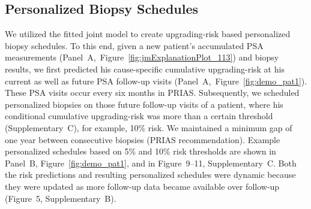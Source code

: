 \subsection{Personalized Biopsy Schedules}
We utilized the fitted joint model to create upgrading-risk based personalized biopsy schedules. To this end, given a new patient's accumulated PSA measurements (Panel~A,~Figure~\ref{fig:jmExplanationPlot_113}) and biopsy results, we first predicted his cause-specific cumulative upgrading-risk at his current as well as future PSA follow-up visits (Panel~A,~Figure~\ref{fig:demo_pat1}). These PSA visits occur every six months in PRIAS. Subsequently, we scheduled personalized biopsies on those future follow-up visits of a patient, where his conditional cumulative upgrading-risk was more than a certain threshold (Supplementary~C), for example, 10\% risk. We maintained a minimum gap of one year between consecutive biopsies (PRIAS recommendation). Example personalized schedules based on 5\% and 10\% risk thresholds are shown in Panel~B, Figure~\ref{fig:demo_pat1}, and in Figure~9--11, Supplementary~C. Both the risk predictions and resulting personalized schedules were dynamic because they were updated as more follow-up data became available over follow-up (Figure~5, Supplementary~B).

